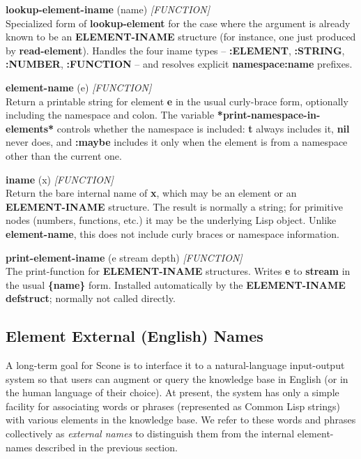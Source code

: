 \documentclass[titlepage,twoside,openright,11pt]{article}
\begin{document}
\textbf{lookup-element-iname} (name) \emph{{[}FUNCTION{]}}\\
Specialized form of \textbf{lookup-element} for the case where the
argument is already known to be an \textbf{ELEMENT-INAME} structure
(for instance, one just produced by \textbf{read-element}). Handles the
four iname types -- \textbf{:ELEMENT}, \textbf{:STRING},
\textbf{:NUMBER}, \textbf{:FUNCTION} -- and resolves explicit
\textbf{namespace:name} prefixes.

\textbf{element-name} (e) \emph{{[}FUNCTION{]}}\\
Return a printable string for element \textbf{e} in the usual
curly-brace form, optionally including the namespace and colon. The
variable \textbf{*print-namespace-in-elements*} controls whether the
namespace is included: \textbf{t} always includes it, \textbf{nil}
never does, and \textbf{:maybe} includes it only when the element is
from a namespace other than the current one.

\textbf{iname} (x) \emph{{[}FUNCTION{]}}\\
Return the bare internal name of \textbf{x}, which may be an element
or an \textbf{ELEMENT-INAME} structure. The result is normally a
string; for primitive nodes (numbers, functions, etc.) it may be the
underlying Lisp object. Unlike \textbf{element-name}, this does not
include curly braces or namespace information.

\textbf{print-element-iname} (e stream depth)
\emph{{[}FUNCTION{]}}\\
The print-function for \textbf{ELEMENT-INAME} structures. Writes
\textbf{e} to \textbf{stream} in the usual \textbf{\{name\}} form.
Installed automatically by the \textbf{ELEMENT-INAME} \textbf{defstruct};
normally not called directly.

\subsection{Element External (English)
Names}\label{element-external-english-names}

A long-term goal for Scone is to interface it to a natural-language
input-output system so that users can augment or query the knowledge
base in English (or in the human language of their choice). At present,
the system has only a simple facility for associating words or phrases
(represented as Common Lisp strings) with various elements in the
knowledge base. We refer to these words and phrases collectively as
\emph{external names} to distinguish them from the internal
element-names described in the previous section.
\end{document}
